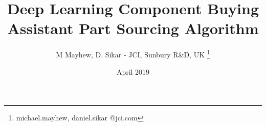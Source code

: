 \title{Deep Learning Component Buying Assistant Part Sourcing Algorithm}

\author{M Mayhew, D. Sikar - JCI, Sunbury R\&D, UK \thanks{michael.mayhew, daniel.sikar @jci.com}}
\date{April 2019}